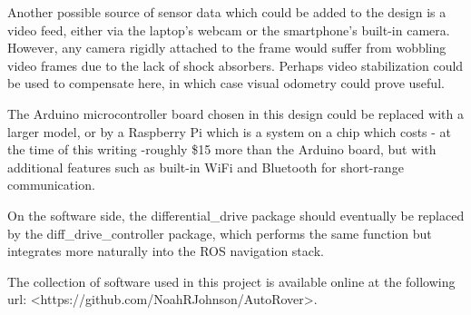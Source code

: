 


Another possible source of sensor data which could be added to the design is a video feed, either via the laptop's webcam or the smartphone's built-in camera. However, any camera rigidly attached to the frame would suffer from wobbling video frames due to the lack of shock absorbers. Perhaps video stabilization could be used to compensate here, in which case visual odometry could prove useful.

The Arduino microcontroller board chosen in this design could be replaced with a larger model, or by a Raspberry Pi which is a system on a chip which costs - at the time of this writing -roughly \$15 more than the Arduino board, but with additional features such as built-in WiFi and Bluetooth for short-range communication. 

On the software side, the differential\_drive package should eventually be replaced by the diff\_drive\_controller package, which performs the same function but integrates more naturally into the ROS navigation stack.



The collection of software used in this project is available online at the following url:
<https://github.com/NoahRJohnson/AutoRover>.

